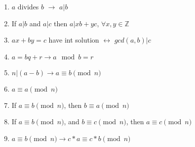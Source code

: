 \begin{enumerate}
    \item $a$ divides $b$ $\rightarrow$ $a | b$
    \item If $a | b$ and $a | c$ then $a | xb + yc$, $\forall x, y \in \mathbb{Z}$
    \item $ax + by = c$ have int solution $\longleftrightarrow$ $gcd(a, b) | c$
    \item $a = bq + r \rightarrow a \mod b = r$
    \item $n | (a-b) \rightarrow a \equiv b \pmod{n}$
    \item $a \equiv a \pmod{n}$
    \item If $a \equiv b \pmod{n}$, then $b \equiv a \pmod{n}$
    \item If $a \equiv b \pmod{n}$, and $b \equiv c \pmod{n}$, then $a \equiv c \pmod{n}$
    \item $ a \equiv b \pmod{n} \rightarrow c * a \equiv c * b \pmod{n}$
\end{enumerate}

